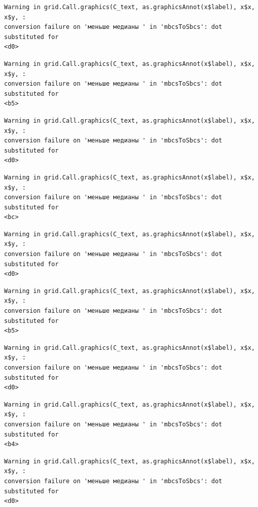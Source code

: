 \documentclass[
  letterpaper,
]{scrbook}
\theoremstyle{definition}
\theoremstyle{remark}
\begin{document}
\begin{verbatim}
Warning in grid.Call.graphics(C_text, as.graphicsAnnot(x$label), x$x, x$y, :
conversion failure on 'меньше медианы ' in 'mbcsToSbcs': dot substituted for
<d0>
\end{verbatim}

\begin{verbatim}
Warning in grid.Call.graphics(C_text, as.graphicsAnnot(x$label), x$x, x$y, :
conversion failure on 'меньше медианы ' in 'mbcsToSbcs': dot substituted for
<b5>
\end{verbatim}

\begin{verbatim}
Warning in grid.Call.graphics(C_text, as.graphicsAnnot(x$label), x$x, x$y, :
conversion failure on 'меньше медианы ' in 'mbcsToSbcs': dot substituted for
<d0>
\end{verbatim}

\begin{verbatim}
Warning in grid.Call.graphics(C_text, as.graphicsAnnot(x$label), x$x, x$y, :
conversion failure on 'меньше медианы ' in 'mbcsToSbcs': dot substituted for
<bc>
\end{verbatim}

\begin{verbatim}
Warning in grid.Call.graphics(C_text, as.graphicsAnnot(x$label), x$x, x$y, :
conversion failure on 'меньше медианы ' in 'mbcsToSbcs': dot substituted for
<d0>
\end{verbatim}

\begin{verbatim}
Warning in grid.Call.graphics(C_text, as.graphicsAnnot(x$label), x$x, x$y, :
conversion failure on 'меньше медианы ' in 'mbcsToSbcs': dot substituted for
<b5>
\end{verbatim}

\begin{verbatim}
Warning in grid.Call.graphics(C_text, as.graphicsAnnot(x$label), x$x, x$y, :
conversion failure on 'меньше медианы ' in 'mbcsToSbcs': dot substituted for
<d0>
\end{verbatim}

\begin{verbatim}
Warning in grid.Call.graphics(C_text, as.graphicsAnnot(x$label), x$x, x$y, :
conversion failure on 'меньше медианы ' in 'mbcsToSbcs': dot substituted for
<b4>
\end{verbatim}

\begin{verbatim}
Warning in grid.Call.graphics(C_text, as.graphicsAnnot(x$label), x$x, x$y, :
conversion failure on 'меньше медианы ' in 'mbcsToSbcs': dot substituted for
<d0>
\end{verbatim}
\end{document}
